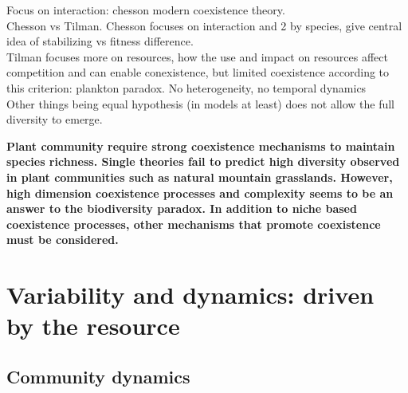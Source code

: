 Focus on interaction: chesson modern coexistence theory.\\

Chesson vs Tilman. 
Chesson focuses on interaction and 2 by species, give central idea of stabilizing vs fitness difference.\\
Tilman focuses more on resources, how the use and impact on resources affect competition and can enable conexistence, but limited coexistence according to this criterion: plankton paradox. No heterogeneity, no temporal dynamics\\

Other things being equal hypothesis (in models at least) does not allow the full diversity to emerge.\\

\parencite{clark_resolving_2007}



\textbf{Plant community require strong coexistence mechanisms to maintain species richness. Single theories fail to predict high diversity observed in plant communities such as natural mountain grasslands. However, high dimension coexistence processes and complexity seems to be an answer to the biodiversity paradox. In addition to niche based coexistence processes, other mechanisms that promote coexistence must be considered.}




 \section{Variability and dynamics: driven by the resource}




\subsection{Community dynamics}


